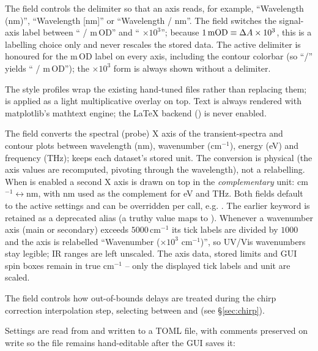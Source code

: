 The  field controls the delimiter so that an axis reads, for
example, ``Wavelength (nm)'', ``Wavelength [nm]'' or ``Wavelength / nm''. The
 field switches the signal-axis label between
``\dA{} / m\,OD'' and ``\dA{} $\times 10^{3}$''; because $1\,\mathrm{mOD}
\equiv \Delta A \times 10^{3}$, this is a labelling choice only and never rescales
the stored data. The active  delimiter is honoured for the
m\,OD label on every axis, including the contour colorbar (so ``/'' yields
``\dA{} / m\,OD''); the $\times 10^{3}$ form is always shown without a delimiter.

The style profiles wrap the existing hand-tuned  files rather
than replacing them;  is applied as a light multiplicative
overlay on top. Text is always rendered with matplotlib's mathtext engine; the
LaTeX backend () is never enabled.

The  field converts the spectral (probe) X axis of the transient-spectra and contour plots between wavelength (nm), wavenumber (cm$^{-1}$), energy (eV) and frequency (THz);  keeps each dataset's stored unit. The conversion is physical (the axis values are recomputed, pivoting through the wavelength), not a relabelling. When  is enabled a second X axis is drawn on top in the \emph{complementary} unit: cm$^{-1}\leftrightarrow$nm, with nm used as the complement for eV and THz. Both fields default to the active settings and can be overridden per call, e.g. . The earlier  keyword is retained as a deprecated alias (a truthy value maps to ). Whenever a wavenumber axis (main or secondary) exceeds $5000\,\mathrm{cm^{-1}}$ its tick labels are divided by $1000$ and the axis is relabelled ``Wavenumber ($\times 10^{3}$ cm$^{-1}$)'', so UV/Vis wavenumbers stay legible; IR ranges are left unscaled. The axis data, stored limits and GUI spin boxes remain in true cm$^{-1}$ -- only the displayed tick labels and unit are scaled.

The  field controls how out-of-bounds delays are treated during the chirp correction interpolation step, selecting between  and  (see \S\ref{sec:chirp}).

Settings are read from and written to a TOML file, with comments preserved on
write so the file remains hand-editable after the GUI saves it:


